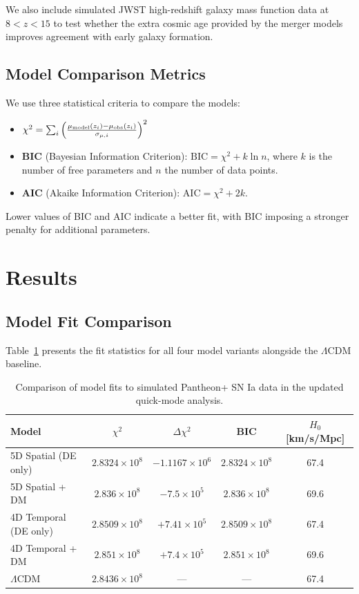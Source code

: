 \documentclass[12pt]{article}
\begin{document}
We also include simulated JWST high-redshift galaxy mass function data at $8 < z < 15$ to test whether the extra cosmic age provided by the merger models improves agreement with early galaxy formation.

\subsection{Model Comparison Metrics}

We use three statistical criteria to compare the models:

\begin{itemize}
    \item $\chi^2 = \sum_i \left( \frac{\mu_{\rm model}(z_i) - \mu_{\rm obs}(z_i)}{\sigma_{\mu,i}} \right)^2$
    \item \textbf{BIC} (Bayesian Information Criterion): $\text{BIC} = \chi^2 + k \ln n$, where $k$ is the number of free parameters and $n$ the number of data points.
    \item \textbf{AIC} (Akaike Information Criterion): $\text{AIC} = \chi^2 + 2k$.
\end{itemize}

Lower values of BIC and AIC indicate a better fit, with BIC imposing a stronger penalty for additional parameters.

\section{Results}

\subsection{Model Fit Comparison}

Table~\ref{tab:comparison} presents the fit statistics for all four model variants alongside the $\Lambda$CDM baseline.

\begin{table}[H]
\centering
\caption{Comparison of model fits to simulated Pantheon+ SN Ia data in the updated quick-mode analysis.}
\label{tab:comparison}
\begin{tabular}{lcccc}
\toprule
Model & $\chi^2$ & $\Delta\chi^2$ & BIC & $H_0$ [km/s/Mpc] \\
\midrule
5D Spatial (DE only) & $2.8324\times10^8$ & $-1.1167\times10^6$ & $2.8324\times10^8$ & 67.4 \\
5D Spatial + DM     & $2.836\times10^8$ & $-7.5\times10^5$ & $2.836\times10^8$ & 69.6 \\
4D Temporal (DE only) & $2.8509\times10^8$ & $+7.41\times10^5$ & $2.8509\times10^8$ & 67.4 \\
4D Temporal + DM     & $2.851\times10^8$ & $+7.4\times10^5$ & $2.851\times10^8$ & 69.6 \\
$\Lambda$CDM          & $2.8436\times10^8$ & --- & --- & 67.4 \\
\bottomrule
\end{tabular}
\end{table}
\end{document}
